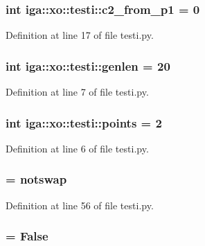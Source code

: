 \subsubsection{\setlength{\rightskip}{0pt plus 5cm}int {\bf iga::xo::testi::c2\_\-from\_\-p1} = 0\hspace{0.3cm}{\tt  [static]}}\label{namespaceiga_1_1xo_1_1testi_f19f3895b0b63e07e309f639253b64b5}




Definition at line 17 of file testi.py.
\subsubsection{\setlength{\rightskip}{0pt plus 5cm}int {\bf iga::xo::testi::genlen} = 20\hspace{0.3cm}{\tt  [static]}}\label{namespaceiga_1_1xo_1_1testi_b9a9e7bf7d4eaf1a5dccef5fa79ab1cd}




Definition at line 7 of file testi.py.
\subsubsection{\setlength{\rightskip}{0pt plus 5cm}int {\bf iga::xo::testi::points} = 2\hspace{0.3cm}{\tt  [static]}}\label{namespaceiga_1_1xo_1_1testi_e5b650e842a677ccc9a0bcf8bee31c4b}




Definition at line 6 of file testi.py.
\subsubsection{ = notswap\hspace{0.3cm}{\tt  [static]}}\label{namespaceiga_1_1xo_1_1testi_a69226f862b87b2779bf01ab448606de}




Definition at line 56 of file testi.py.
\subsubsection{ = False\hspace{0.3cm}{\tt  [static]}}\label{namespaceiga_1_1xo_1_1testi_a69226f862b87b2779bf01ab448606de}




